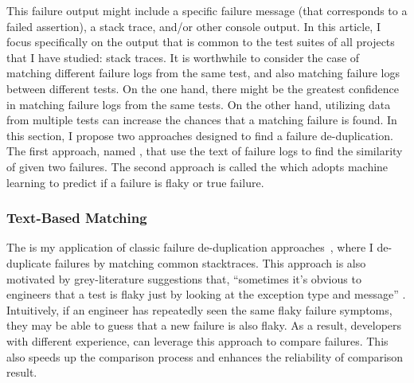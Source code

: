 This failure output might include a specific failure message (that corresponds to a failed assertion), a stack trace, and/or other console output.
In this article, I focus specifically on the output that is common to the test suites of all projects that I have studied: stack traces.
It is worthwhile to consider the case of matching different failure logs from the same test, and also matching failure logs between different tests.
On the one hand, there might be the greatest confidence in matching failure logs from the same tests.
On the other hand, utilizing data from multiple tests can increase the chances that a matching failure is found.
In this section, I propose two approaches designed to find a failure de-duplication.
The first approach, named \syntax, that use the text of failure logs to find the similarity of given two failures.
The second approach is called the \classifier which adopts machine learning to predict if a failure is flaky or true failure.




\subsubsection{Text-Based Matching}
\label{syntax}
The \syntax is my application of classic failure de-duplication approaches~\cite{Podgurski03Automated,Jiang17WhatCauses}, where I de-duplicate failures by matching common stacktraces. %
This approach is also motivated by grey-literature suggestions that, ``sometimes it's obvious to engineers that a test is flaky just by looking at the exception type and message'' \cite{gradlePreventingFlaky}.
Intuitively, if an engineer has repeatedly seen the same flaky failure symptoms, they may be able to guess that a new failure is also flaky.
As a result, developers with different experience, can leverage this approach to compare failures.
This also speeds up the comparison process and enhances the reliability of comparison result. 

